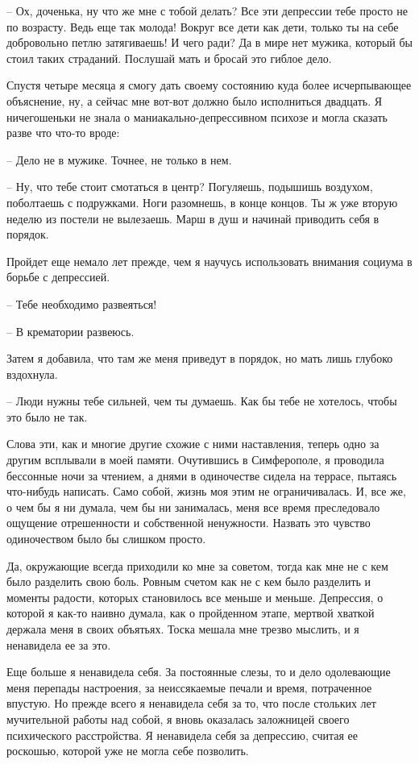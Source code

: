 \documentclass[
]{book}
\begin{document}
-- Ох, доченька, ну что же мне с тобой делать? Все эти депрессии тебе просто не по возрасту. Ведь еще так молода! Вокруг все дети как дети, только ты на себе добровольно петлю затягиваешь! И чего ради? Да в мире нет мужика, который бы стоил таких страданий. Послушай мать и бросай это гиблое дело.

Спустя четыре месяца я смогу дать своему состоянию куда более исчерпывающее объяснение, ну, а сейчас мне вот-вот должно было исполниться двадцать. Я ничегошеньки не знала о маниакально-депрессивном психозе и могла сказать разве что что-то вроде:

-- Дело не в мужике. Точнее, не только в нем.

-- Ну, что тебе стоит смотаться в центр? Погуляешь, подышишь воздухом, поболтаешь с подружками. Ноги разомнешь, в конце концов. Ты ж уже вторую неделю из постели не вылезаешь. Марш в душ и начинай приводить себя в порядок.

Пройдет еще немало лет прежде, чем я научусь использовать внимания социума в борьбе с депрессией.

-- Тебе необходимо развеяться!

-- В крематории развеюсь.

Затем я добавила, что там же меня приведут в порядок, но мать лишь глубоко вздохнула.

-- Люди нужны тебе сильней, чем ты думаешь. Как бы тебе не хотелось, чтобы это было не так.

Слова эти, как и многие другие схожие с ними наставления, теперь одно за другим всплывали в моей памяти. Очутившись в Симферополе, я проводила бессонные ночи за чтением, а днями в одиночестве сидела на террасе, пытаясь что-нибудь написать. Само собой, жизнь моя этим не ограничивалась. И, все же, о чем бы я ни думала, чем бы ни занималась, меня все время преследовало ощущение отрешенности и собственной ненужности. Назвать это чувство одиночеством было бы слишком просто.

Да, окружающие всегда приходили ко мне за советом, тогда как мне не с кем было разделить свою боль. Ровным счетом как не с кем было разделить и моменты радости, которых становилось все меньше и меньше. Депрессия, о которой я как-то наивно думала, как о пройденном этапе, мертвой хваткой держала меня в своих объятьях. Тоска мешала мне трезво мыслить, и я ненавидела ее за это.

Еще больше я ненавидела себя. За постоянные слезы, то и дело одолевающие меня перепады настроения, за неиссякаемые печали и время, потраченное впустую. Но прежде всего я ненавидела себя за то, что после стольких лет мучительной работы над собой, я вновь оказалась заложницей своего психического расстройства. Я ненавидела себя за депрессию, считая ее роскошью, которой уже не могла себе позволить.
\end{document}
